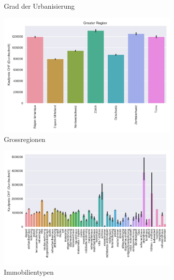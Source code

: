 \begin{figure}[h]
\begin{subfigure}{.5\textwidth}
  \caption{Grad der Urbanisierung}
\end{subfigure}
\begin{subfigure}{.5\textwidth}
  \centering
  \includegraphics[width=\linewidth]{images/anhang/analysis/barplot_greater_region_id.png}
  \caption{Grossregionen}
\end{subfigure}
\begin{subfigure}{.5\textwidth}
  \centering
  \includegraphics[width=\linewidth]{images/anhang/analysis/barplot_gruppen.png}
  \caption{Immobilientypen}
\end{subfigure}
\begin{subfigure}{.5\textwidth}
  \centering

\end{subfigure}
\end{figure}
